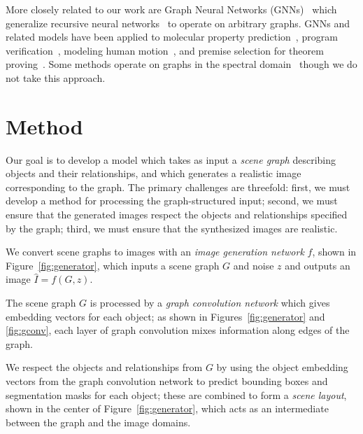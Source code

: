 \documentclass[10pt,twocolumn,letterpaper]{article}
\begin{document}
More closely related to our work are Graph Neural Networks (GNNs)~\cite{goller1996learning,gori2005new,scarselli2009graph} which generalize recursive neural networks~\cite{frasconi1998general,sperduti1997supervised,socher2011parsing} to operate on arbitrary graphs. GNNs and related models have been applied to molecular property prediction~\cite{duvenaud2015convolutional}, program verification~\cite{li2016gated}, modeling human motion~\cite{jain2016structural}, and premise selection for theorem proving~\cite{wang2017premise}. Some methods operate on graphs in the spectral domain~\cite{bruna2014spectral,henaff2015deep,kipf2017semi} though we do not take this approach.
 

\section{Method}
Our goal is to develop a model which takes as input a \emph{scene graph}
describing objects and their relationships, and which generates a realistic
image corresponding to the graph. The primary challenges are threefold: first,
we must develop a method for processing the graph-structured input; second, we
must ensure that the generated images respect the objects and relationships
specified by the graph; third, we must ensure that the synthesized images are realistic.

We convert scene graphs to images with an \emph{image generation network} $f$,
shown in Figure~\ref{fig:generator}, which inputs a scene graph $G$ and noise
$z$ and outputs an image $\hat I = f(G, z)$.

The scene graph $G$ is processed by a \emph{graph convolution network} which 
gives embedding vectors for each object; as shown in Figures~\ref{fig:generator}
and \ref{fig:gconv},
each layer of graph convolution mixes information along edges of the graph.

We respect the objects and relationships from $G$ by using the object
embedding vectors from the graph convolution network to predict bounding boxes
and segmentation masks for each object; these are combined to form a \emph{scene layout},
shown in the center of Figure~\ref{fig:generator}, which acts as an intermediate between
the graph and the image domains.
\end{document}
